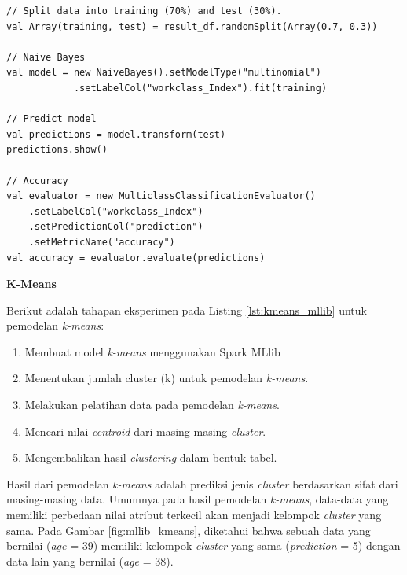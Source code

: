 \documentclass[a4paper,twoside]{article}
\begin{document}
\begin{enumerate}
\begin{lstlisting}[basicstyle=\ttfamily, frame=single,
	columns=fullflexible, keepspaces=true, breaklines=true, label=lst:naivebayes_mllib, caption=Eksperimen Naive Bayes Spark MLlib]
// Split data into training (70%) and test (30%).
val Array(training, test) = result_df.randomSplit(Array(0.7, 0.3))

// Naive Bayes
val model = new NaiveBayes().setModelType("multinomial")
			.setLabelCol("workclass_Index").fit(training)
			
// Predict model
val predictions = model.transform(test)
predictions.show()

// Accuracy
val evaluator = new MulticlassClassificationEvaluator()
	.setLabelCol("workclass_Index")
	.setPredictionCol("prediction")
	.setMetricName("accuracy")
val accuracy = evaluator.evaluate(predictions)

\end{lstlisting}


\textbf{K-Means}

\noindent Berikut adalah tahapan eksperimen pada Listing \ref{lst:kmeans_mllib} untuk pemodelan \textit{k-means}:
\begin{enumerate}
\item Membuat model \textit{k-means} menggunakan Spark MLlib
\item Menentukan jumlah cluster (k) untuk pemodelan \textit{k-means}.
\item Melakukan pelatihan data pada pemodelan \textit{k-means}.
\item Mencari nilai \textit{centroid} dari masing-masing \textit{cluster}.
\item Mengembalikan hasil \textit{clustering} dalam bentuk tabel.

\end{enumerate}	


\par Hasil dari pemodelan \textit{k-means} adalah prediksi jenis \textit{cluster} berdasarkan sifat dari masing-masing data. Umumnya pada hasil pemodelan \textit{k-means}, data-data yang memiliki perbedaan nilai atribut terkecil akan menjadi kelompok \textit{cluster} yang sama. Pada Gambar \ref{fig:mllib_kmeans}, diketahui bahwa sebuah data yang bernilai (\textit{age} = 39) memiliki kelompok \textit{cluster} yang sama (\textit{prediction} = 5) dengan data lain yang bernilai (\textit{age} = 38).


\end{enumerate}
\end{document}
